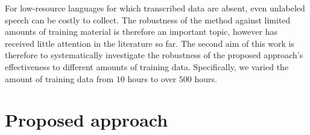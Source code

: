 \documentclass[a4paper]{article}
\begin{document}


For low-resource languages for which transcribed data are absent, 
even unlabeled speech can be costly to collect. The robustness of the method against limited amounts of training material is therefore an important topic, however has received little attention in the literature so far. The second aim of this work is therefore to systematically investigate the robustness 
of the proposed approach's effectiveness to different amounts of training data. Specifically, we varied the amount of training data from $10$ hours to over $500$ hours.
 


\section{Proposed approach}
\end{document}
